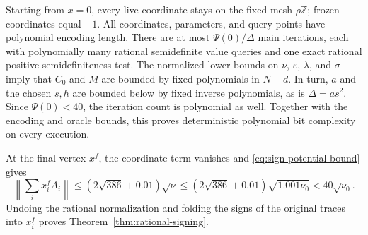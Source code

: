 Starting from $x=0$, every live coordinate stays on the fixed mesh
$\rho\mathbb Z$; frozen coordinates equal $\pm1$.  All coordinates,
parameters, and query points have polynomial encoding length.
There are at most $\Psi(0)/\Delta$ main iterations, each with
polynomially many rational semidefinite value queries and one exact
rational positive-semidefiniteness test. The normalized lower bounds
on $\nu$, $\varepsilon$, $\lambda$, and $\sigma$ imply that $C_0$ and
$M$ are bounded by fixed polynomials in $N+d$. In turn, $a$ and the
chosen $s,h$ are bounded below by fixed inverse polynomials, as is
$\Delta=as^2$. Since $\Psi(0)<40$, the iteration count is polynomial
as well. Together with the encoding and oracle bounds, this proves
deterministic polynomial bit complexity on every execution.

At the final vertex $x^f$, the coordinate term vanishes and
\eqref{eq:sign-potential-bound} gives
\[
 \left\|\sum_i x_i^f A_i\right\|
 \le(2\sqrt{386}+0.01)\sqrt\nu
 \le(2\sqrt{386}+0.01)\sqrt{1.001\nu_0}
 <40\sqrt{\nu_0}.
\]
Undoing the rational normalization and folding the signs of the
original traces into $x_i^f$ proves
Theorem~\ref{thm:rational-signing}.
